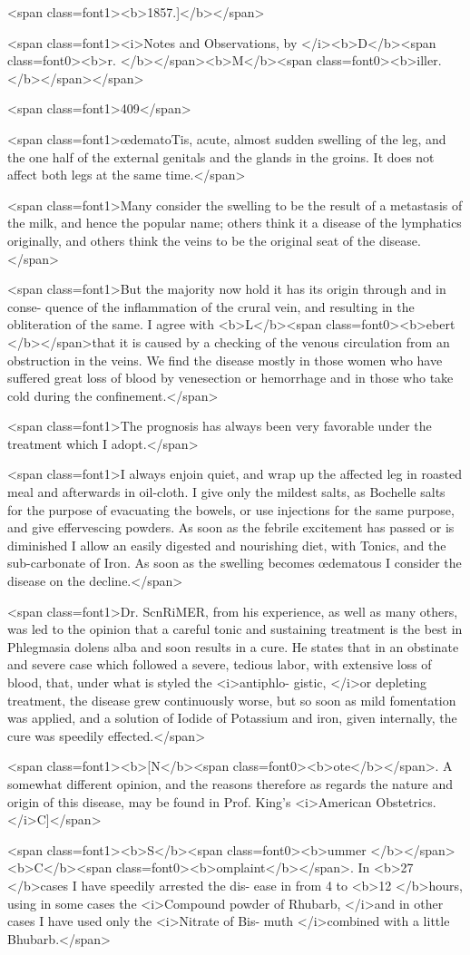 <span class=font1><b>1857.]</b></span>

<span class=font1><i>Notes and Observations, by </i><b>D</b><span class=font0><b>r. </b></span><b>M</b><span class=font0><b>iller.</b></span></span>

<span class=font1>409</span>

<span class=font1>œdematoTis, acute, almost sudden swelling of the leg, and the one half
of the external genitals and the glands in the groins. It does not
affect both legs at the same time.</span>

<span class=font1>Many consider the swelling to be the result of a metastasis of the
milk, and hence the popular name; others think it a disease of the
lymphatics originally, and others think the veins to be the original
seat of the disease.</span>

<span class=font1>But the majority now hold it has its origin through and in conse-
quence of the inflammation of the crural vein, and resulting in the
obliteration of the same. I agree with <b>L</b><span class=font0><b>ebert </b></span>that it is caused by a
checking of the venous circulation from an obstruction in the veins.
We find the disease mostly in those women who have suffered great
loss of blood by venesection or hemorrhage and in those who take cold
during the confinement.</span>

<span class=font1>The prognosis has always been very favorable under the treatment
which I adopt.</span>

<span class=font1>I always enjoin quiet, and wrap up the affected leg in roasted meal
and afterwards in oil-cloth. I give only the mildest salts, as Bochelle
salts for the purpose of evacuating the bowels, or use injections for
the same purpose, and give effervescing powders. As soon as the
febrile excitement has passed or is diminished I allow an easily digested
and nourishing diet, with Tonics, and the sub-carbonate of Iron. As
soon as the swelling becomes œdematous I consider the disease on the
decline.</span>

<span class=font1>Dr. ScnRiMER, from his experience, as well as many others, was led
to the opinion that a careful tonic and sustaining treatment is the best
in Phlegmasia dolens alba and soon results in a cure. He states that
in an obstinate and severe case which followed a severe, tedious labor,
with extensive loss of blood, that, under what is styled the <i>antiphlo-
gistic, </i>or depleting treatment, the disease grew continuously worse, but
so soon as mild fomentation was applied, and a solution of Iodide of
Potassium and iron, given internally, the cure was speedily effected.</span>

<span class=font1><b>[N</b><span class=font0><b>ote</b></span>. A somewhat different opinion, and the reasons therefore as
regards the nature and origin of this disease, may be found in Prof.
King's <i>American Obstetrics. </i>C]</span>

<span class=font1><b>S</b><span class=font0><b>ummer </b></span><b>C</b><span class=font0><b>omplaint</b></span>. In <b>27 </b>cases I have speedily arrested the dis-
ease in from 4 to <b>12 </b>hours, using in some cases the <i>Compound powder
of Rhubarb, </i>and in other cases I have used only the <i>Nitrate of Bis-
muth </i>combined with a little Bhubarb.</span>
